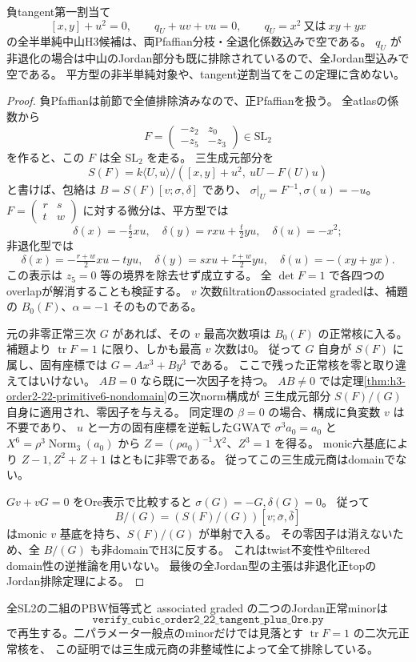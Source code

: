 \begin{theorem}\label{thm:h3-order2-22-tangent-first-semisimple-empty}
負tangent第一割当て
\[
 [x,y]+u^2=0,\qquad q_U+uv+vu=0,\qquad
 q_U=x^2\ \text{又は}\ xy+yx
\]
の全半単純中山H3候補は、両Pfaffian分枝・全退化係数込みで空である。
$q_U$ が非退化の場合は中山のJordan部分も既に排除されているので、全Jordan型込みで空である。
平方型の非半単純対象や、tangent逆割当てをこの定理に含めない。
\end{theorem}
\begin{proof}
負Pfaffianは前節で全値排除済みなので、正Pfaffianを扱う。
全atlasの係数から
\[
 F=\begin{pmatrix}-z_2&z_0\\-z_5&-z_3\end{pmatrix}\in\mathrm{SL}_2
\]
を作ると、この $F$ は全 $\mathrm{SL}_2$ を走る。
三生成元部分を
\[
 S(F)=k\langle U,u\rangle/([x,y]+u^2,\ uU-F(U)u)
\]
と書けば、包絡は $B=S(F)[v;\sigma,\delta]$ であり、
$\sigma|_U=F^{-1},\sigma(u)=-u$。
$F=\left(\begin{smallmatrix}r&s\\t&w\end{smallmatrix}\right)$ に対する微分は、平方型では
\[
 \delta(x)=-\tfrac t2xu,\quad \delta(y)=rxu+\tfrac t2yu,\quad \delta(u)=-x^2;
\]
非退化型では
\[
 \delta(x)=-\tfrac{r+w}{2}xu-tyu,\quad
 \delta(y)=sxu+\tfrac{r+w}{2}yu,\quad \delta(u)=-(xy+yx).
\]
この表示は $z_5=0$ 等の境界を除去せず成立する。
全 $\det F=1$ で各四つのoverlapが解消することも検証する。
$v$ 次数filtrationのassociated gradedは、補題の $B_0(F)$、$\alpha=-1$ そのものである。

元の非零正常三次 $G$ があれば、その $v$ 最高次数項は $B_0(F)$ の正常核に入る。
補題より $\operatorname{tr}F=1$ に限り、しかも最高 $v$ 次数は0。
従って $G$ 自身が $S(F)$ に属し、固有座標では $G=Ax^3+By^3$ である。
ここで残った正常核を零と取り違えてはいけない。
$AB=0$ なら既に一次因子を持つ。
$AB\ne0$ では定理\ref{thm:h3-order2-22-primitive6-nondomain}の三次norm構成が
三生成元部分 $S(F)/(G)$ 自身に適用され、零因子を与える。
同定理の $\beta=0$ の場合、構成に負変数 $v$ は不要であり、
$u$ と一方の固有座標を逆転したGWAで
$\sigma^3a_0=a_0$ と $X^6=\rho^3\operatorname{Norm}_3(a_0)$ から
$Z=(\rho a_0)^{-1}X^2$、$Z^3=1$ を得る。
monic六基底により $Z-1,Z^2+Z+1$ はともに非零である。
従ってこの三生成元商はdomainでない。

$Gv+vG=0$ をOre表示で比較すると $\sigma(G)=-G,\delta(G)=0$。
従って
\[
 B/(G)=(S(F)/(G))[v;\bar\sigma,\bar\delta]
\]
はmonic $v$ 基底を持ち、$S(F)/(G)$ が単射で入る。
その零因子は消えないため、全 $B/(G)$ も非domainでH3に反する。
これはtwist不変性やfiltered domain性の逆推論を用いない。
最後の全Jordan型の主張は非退化正topのJordan排除定理による。
\end{proof}

全SL2の二組のPBW恒等式と associated graded の二つのJordan正常minorは
\[
\texttt{verify\_cubic\_order2\_22\_tangent\_plus\_Ore.py}
\]
で再生する。二パラメータ一般点のminorだけでは見落とす $\operatorname{tr}F=1$ の二次元正常核を、
この証明では三生成元商の非整域性によって全て排除している。
